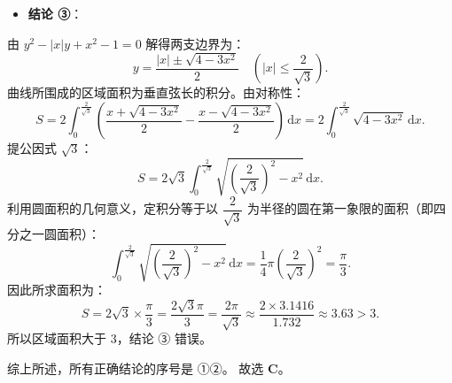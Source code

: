 \begin{answer}
\begin{itemize}
\item \textbf{结论 ③}：
\end{itemize}
  由 $y^2 - |x|y + x^2 - 1 = 0$ 解得两支边界为：
\nopagebreak[4]
\[y = \frac{|x| \pm \sqrt{4 - 3x^2}}{2} \quad \left(|x| \leqslant \frac{2}{\sqrt{3}}\right).\]
  曲线所围成的区域面积为垂直弦长的积分。由对称性：
\nopagebreak[4]
\[S = 2 \int_0^{\frac{2}{\sqrt{3}}} \left( \frac{x + \sqrt{4 - 3x^2}}{2} - \frac{x - \sqrt{4 - 3x^2}}{2} \right) \,\mathrm{d}x = 2 \int_0^{\frac{2}{\sqrt{3}}} \sqrt{4 - 3x^2} \,\mathrm{d}x.\]
  提公因式 $\sqrt{3}$：
\nopagebreak[4]
\[S = 2\sqrt{3} \int_0^{\frac{2}{\sqrt{3}}} \sqrt{\left(\frac{2}{\sqrt{3}}\right)^2 - x^2} \,\mathrm{d}x.\]
  利用圆面积的几何意义，定积分等于以 $\dfrac{2}{\sqrt{3}}$ 为半径的圆在第一象限的面积（即四分之一圆面积）：
\nopagebreak[4]
\[\int_0^{\frac{2}{\sqrt{3}}} \sqrt{\left(\frac{2}{\sqrt{3}}\right)^2 - x^2} \,\mathrm{d}x = \frac{1}{4} \pi \left(\frac{2}{\sqrt{3}}\right)^2 = \frac{\pi}{3}.\]
  因此所求面积为：
\nopagebreak[4]
\[S = 2\sqrt{3} \times \frac{\pi}{3} = \frac{2\sqrt{3}\pi}{3} = \frac{2\pi}{\sqrt{3}} \approx \frac{2 \times 3.1416}{1.732} \approx 3.63 > 3.\]
  所以区域面积大于 3，结论 ③ 错误。

综上所述，所有正确结论的序号是 ①②。
故选 \textbf{C}。


\par\medskip

\end{answer}

